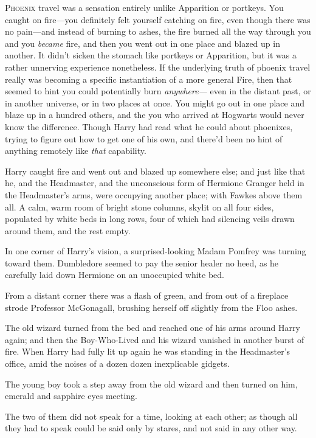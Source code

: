 
\lettrine{P}{hoenix} travel 
was a sensation entirely unlike Apparition or portkeys. You caught on 
fire---you definitely felt yourself catching on fire, even though there was no 
pain---and instead of burning to ashes, the fire burned all the way through you 
and you \emph{became} fire, and then you went out in one place and blazed up in 
another. It didn't sicken the stomach like portkeys or Apparition, but it was a 
rather unnerving experience nonetheless. If the underlying truth of phoenix 
travel really was becoming a specific instantiation of a more general Fire, 
then that seemed to hint you could potentially burn \emph{anywhere---} even in 
the distant past, or in another universe, or in two places at once. You might 
go out in one place and blaze up in a hundred others, and the you who arrived 
at Hogwarts would never know the difference. Though Harry had read what he 
could about phoenixes, trying to figure out how to get one of his own, and 
there'd been no hint of anything remotely like \emph{that} capability.

Harry caught fire and went out and blazed up somewhere else; and just like that 
he, and the Headmaster, and the unconscious form of Hermione Granger held in 
the Headmaster's arms, were occupying another place; with Fawkes above them 
all. A calm, warm room of bright stone columns, skylit on all four sides, 
populated by white beds in long rows, four of which had silencing veils drawn 
around them, and the rest empty.

In one corner of Harry's vision, a surprised-looking Madam Pomfrey was turning 
toward them. Dumbledore seemed to pay the senior healer no heed, as he 
carefully laid down Hermione on an unoccupied white bed.

From a distant corner there was a flash of green, and from out of a fireplace 
strode Professor McGonagall, brushing herself off slightly from the Floo ashes.

The old wizard turned from the bed and reached one of his arms around Harry 
again; and then the Boy-Who-Lived and his wizard vanished in another burst of 
fire.
\sbreak
When Harry had fully lit up again he was standing in the Headmaster's office, 
amid the noises of a dozen dozen inexplicable gidgets.

The young boy took a step away from the old wizard and then turned on him, 
emerald and sapphire eyes meeting.

The two of them did not speak for a time, looking at each other; as though all 
they had to speak could be said only by stares, and not said in any other way.

